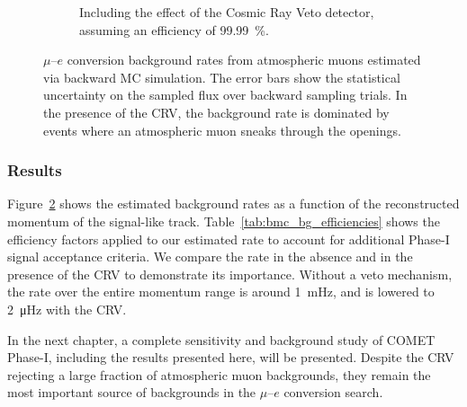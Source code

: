 \begin{figure}[t]
\begin{subfigure}[t]{0.48\textwidth}
        \caption{Including the effect of the Cosmic Ray Veto detector, assuming
        an efficiency of \SI{99.99}{\percent}.}
        \label{fig:bmc_rate_vs_momentum_crv}
    \end{subfigure}
    \caption{ 
        $\mu$--$e$ conversion background rates from atmospheric muons
        estimated via backward MC simulation. The error bars show the
        statistical uncertainty on the sampled flux over backward sampling
        trials. In the presence of the CRV, the background rate is dominated by
        events where an atmospheric muon sneaks through the openings. }
        \label{fig:bmc_rate_vs_momentum}
\end{figure}

\subsubsection{Results}
Figure~\ref{fig:bmc_rate_vs_momentum} shows the estimated background rates as a
function of the reconstructed momentum of the signal-like track.
Table~\ref{tab:bmc_bg_efficiencies} shows the efficiency factors applied to our
estimated rate to account for additional Phase-I signal acceptance criteria. We
compare the rate in the absence and in the presence of the CRV to demonstrate
its importance. Without a veto mechanism, the rate over the entire momentum
range is around \SI{1}{\mHz}, and is lowered to \SI{2}{\micro\hertz} with the
CRV. 

In the next chapter, a complete sensitivity and background study of COMET
Phase-I, including the results presented here, will be presented. Despite the
CRV rejecting a large fraction of atmospheric muon backgrounds, they remain the
most important source of backgrounds in the $\mu$--$e$ conversion search. 